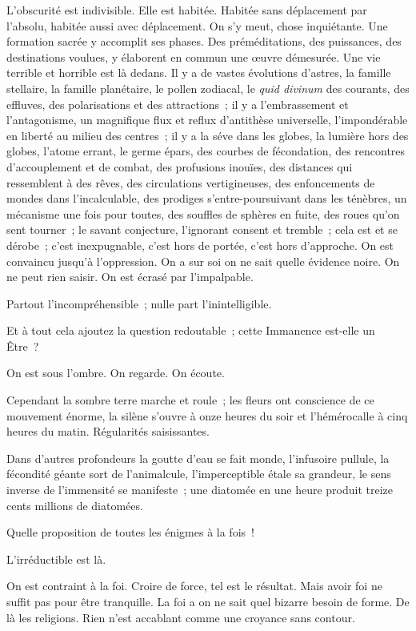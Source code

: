 \documentclass[french,twoside]{book} %
\begin{document}
L’obscurité est indivisible. Elle est habitée. Habitée sans déplacement par l’absolu, habitée aussi avec déplacement. On s’y meut, chose inquiétante. Une formation sacrée y accomplit ses phases. Des préméditations, des puissances, des destinations voulues, y élaborent en commun une œuvre démesurée. Une vie terrible et horrible est là dedans. Il y a de vastes évolutions d’astres, la famille stellaire, la famille planétaire, le pollen zodiacal, le \emph{quid divinum} des courants, des effluves, des polarisations et des attractions ; il y a l’embrassement et l’antagonisme, un magnifique flux et reflux d’antithèse universelle, l’impondérable en  liberté au milieu des centres ; il y a la séve dans les globes, la lumière hors des globes, l’atome errant, le germe épars, des courbes de fécondation, des rencontres d’accouplement et de combat, des profusions inouïes, des distances qui ressemblent à des rêves, des circulations vertigineuses, des enfoncements de mondes dans l’incalculable, des prodiges s’entre-poursuivant dans les ténèbres, un mécanisme une fois pour toutes, des souffles de sphères en fuite, des roues qu’on sent tourner ; le savant conjecture, l’ignorant consent et tremble ; cela est et se dérobe ; c’est inexpugnable, c’est hors de portée, c’est hors d’approche. On est convaincu jusqu’à l’oppression. On a sur soi on ne sait quelle évidence noire. On ne peut rien saisir. On est écrasé par l’impalpable.\par
Partout l’incompréhensible ; nulle part l’inintelligible.\par
Et à tout cela ajoutez la question redoutable ; cette Immanence est-elle un Être ?\par
On est sous l’ombre. On regarde. On écoute.\par
Cependant la sombre terre marche et roule ; les fleurs ont conscience de ce mouvement énorme, la silène s’ouvre à onze heures du soir et l’hémérocalle à cinq heures du matin. Régularités saisissantes.\par
Dans d’autres profondeurs la goutte d’eau se fait monde, l’infusoire pullule, la fécondité géante sort de l’animalcule, l’imperceptible étale sa grandeur, le sens inverse de l’immensité se manifeste ; une diatomée en une heure produit treize cents millions de diatomées.\par
Quelle proposition de toutes les énigmes à la fois !\par
 L’irréductible est là.\par
On est contraint à la foi. Croire de force, tel est le résultat. Mais avoir foi ne suffit pas pour être tranquille. La foi a on ne sait quel bizarre besoin de forme. De là les religions. Rien n’est accablant comme une croyance sans contour.\par
\end{document}
